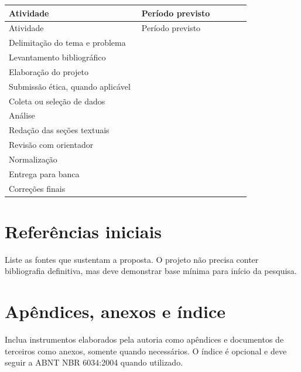 \begin{longtable}{p{0.45\linewidth}p{0.37\linewidth}}
\toprule
Atividade & Período previsto \\
\midrule
\endfirsthead
\toprule
Atividade & Período previsto \\
\midrule
\endhead
Delimitação do tema e problema & \\
Levantamento bibliográfico & \\
Elaboração do projeto & \\
Submissão ética, quando aplicável & \\
Coleta ou seleção de dados & \\
Análise & \\
Redação das seções textuais & \\
Revisão com orientador & \\
Normalização & \\
Entrega para banca & \\
Correções finais & \\
\bottomrule
\end{longtable}

\section{Referências iniciais}

Liste as fontes que sustentam a proposta. O projeto não precisa conter bibliografia definitiva, mas deve demonstrar base mínima para início da pesquisa.

\section{Apêndices, anexos e índice}

Inclua instrumentos elaborados pela autoria como apêndices e documentos de terceiros como anexos, somente quando necessários. O índice é opcional e deve seguir a ABNT NBR 6034:2004 quando utilizado.
